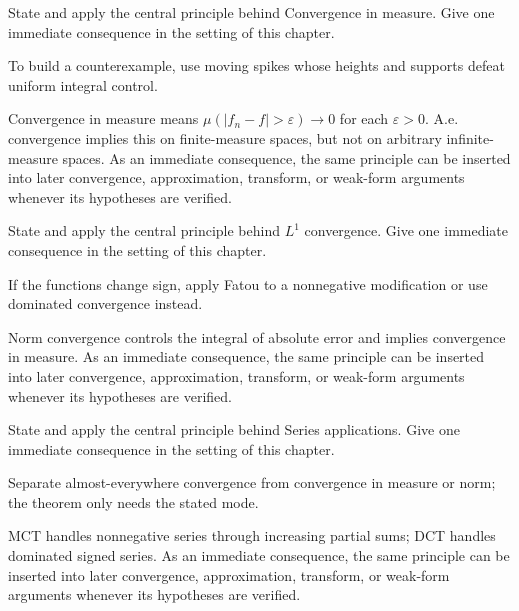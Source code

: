 \begin{exercise}\label{exr:iii04-05}
State and apply the central principle behind Convergence in measure. Give one immediate consequence in the setting of this chapter.
\end{exercise}
\begin{hint}
To build a counterexample, use moving spikes whose heights and supports defeat uniform integral control.
\end{hint}
\begin{solution}
Convergence in measure means $\mu(|f_n-f|>\varepsilon)\to0$ for each $\varepsilon>0$. A.e. convergence implies this on finite-measure spaces, but not on arbitrary infinite-measure spaces. As an immediate consequence, the same principle can be inserted into later convergence, approximation, transform, or weak-form arguments whenever its hypotheses are verified.
\end{solution}

\begin{exercise}\label{exr:iii04-06}
State and apply the central principle behind $L^1$ convergence. Give one immediate consequence in the setting of this chapter.
\end{exercise}
\begin{hint}
If the functions change sign, apply Fatou to a nonnegative modification or use dominated convergence instead.
\end{hint}
\begin{solution}
Norm convergence controls the integral of absolute error and implies convergence in measure. As an immediate consequence, the same principle can be inserted into later convergence, approximation, transform, or weak-form arguments whenever its hypotheses are verified.
\end{solution}

\begin{exercise}\label{exr:iii04-07}
State and apply the central principle behind Series applications. Give one immediate consequence in the setting of this chapter.
\end{exercise}
\begin{hint}
Separate almost-everywhere convergence from convergence in measure or norm; the theorem only needs the stated mode.
\end{hint}
\begin{solution}
MCT handles nonnegative series through increasing partial sums; DCT handles dominated signed series. As an immediate consequence, the same principle can be inserted into later convergence, approximation, transform, or weak-form arguments whenever its hypotheses are verified.
\end{solution}

